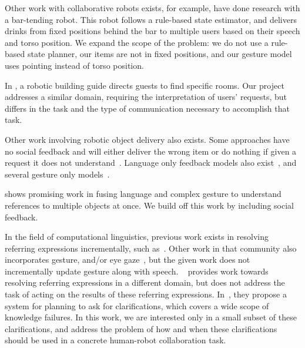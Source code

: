\documentclass[letterpaper]{article}
\begin{document}
Other work with collaborative robots exists, for example, \cite{foster12} have done research with a bar-tending robot. This robot follows a rule-based state estimator, and delivers drinks from fixed positions behind the bar to multiple users based on their speech and torso position. 
We expand the scope of the problem: we do not use a rule-based state planner, our items are not in fixed positions, and our gesture model uses pointing instead of torso position. 

In \cite{bohus14},  a robotic building guide directs guests to find specific rooms. Our project addresses a similar domain, requiring the interpretation of users' requests, but differs in the task and the type of communication necessary to accomplish that task. 

Other work involving robotic object delivery also exists. Some approaches have no social feedback and will either deliver the wrong item or do nothing if given a
request it does not understand~\cite{tellex11,matuszek12,tellex12,misra14}. Language only feedback models also 
exist~\cite{chai14,macmahon06,tellex11,matuszek12,guadarrama14,hewlett11,misra14}, and several gesture only models~\cite{waldherr00,marge11}.


\cite{matuszek14} shows promising work in fusing language and complex gesture to understand references to multiple objects at once. We build off this work by including social feedback. 

In the field of computational linguistics, previous work exists in resolving referring expressions incrementally, such as~\cite{schlangen09,kruijffincremental,Gieselmann}. Other work in that community also incorporates gesture, and/or eye gaze~\cite{kennington13,kennington15a}, but the given work does not incrementally update gesture along with speech. ~\cite{chairmi} provides work towards resolving referring expressions in a different domain, but does not address the task of acting on the results of these referring expressions. In~\cite{kruijffclarification}, they propose a system for planning to ask for clarifications, which covers a wide scope of knowledge failures. In this work, we are interested only in a small subset of these clarifications, and address the problem of how and when these clarifications should be used in a concrete human-robot collaboration task. 



\end{document}
